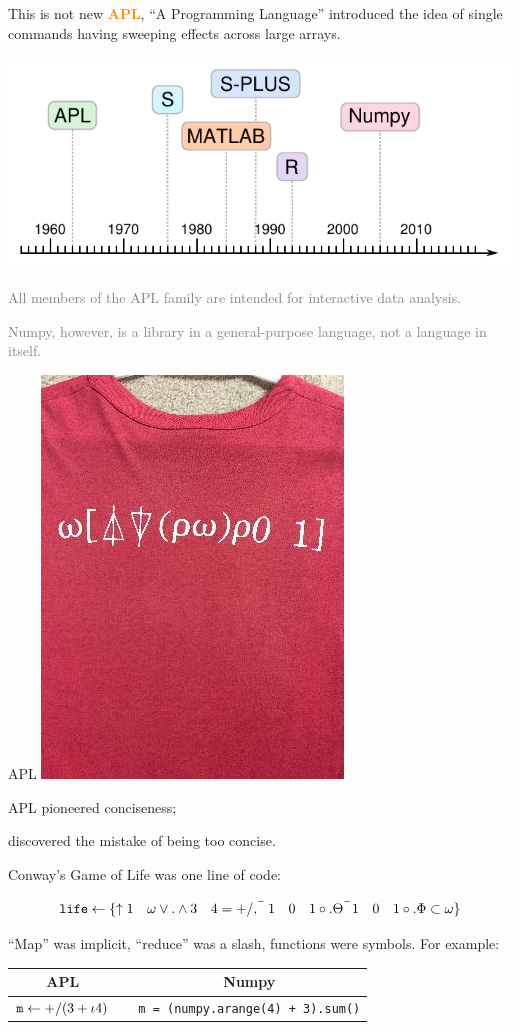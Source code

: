 \documentclass[aspectratio=169]{beamer}
\begin{document}
\begin{frame}{This is not new}
\Large
\vspace{0.5 cm}
\textcolor{darkorange}{\bf APL}, ``A Programming Language'' introduced the idea of single commands having sweeping effects across large arrays.

\begin{center}
\includegraphics[width=0.75\linewidth]{apl-timeline.pdf}
\end{center}

\normalsize
\textcolor{gray}{All members of the APL family are intended for interactive data analysis.}

\textcolor{gray}{Numpy, however, is a library in a general-purpose language, not a language in itself.}
\end{frame}

\begin{frame}{APL}
\Large
\vspace{0.5 cm}
\hfill \mbox{\includegraphics[height=3 cm]{tshirt.jpg}\hspace{-0.25 cm}}

\vspace{-2.75 cm}
APL pioneered conciseness;

discovered the mistake of being too concise.

\large
\vspace{1.25 cm}
Conway's Game of Life was one line of code:

\vspace{-0.3 cm}
\[ \mbox{\tt life} \leftarrow \{\uparrow 1\quad\omega \vee.\wedge 3\quad 4=+/,^{^-} 1\quad0\quad1\circ.\Theta^{^-} 1\quad0\quad1\circ.\Phi\subset\omega\} \]

\vspace{0.5 cm}
``Map'' was implicit, ``reduce'' was a slash, functions were symbols. For example:

\begin{center}
\renewcommand{\arraystretch}{1.2}
\begin{tabular}{c c c}
APL & \mbox{\hspace{0.5 cm}} & Numpy \\\hline
$\displaystyle \mbox{\tt m} \leftarrow +/(3+\iota 4)$ & & {\tt\normalsize m = (numpy.arange(4) + 3).sum()}
\end{tabular}
\end{center}
\end{frame}
\end{document}
